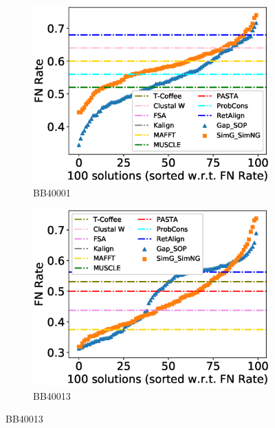 \begin{figure}[!htbp]
	\centering
	\begin{adjustwidth}{-1.5cm}{-1cm}
		\begin{subfigure}{0.22\textwidth}
			\includegraphics[width=\columnwidth]{Figure/summary/precomputedInit/Balibase/BB40001_fnrate_density_single_run}
			\caption{BB40001}
		\end{subfigure}	
		\begin{subfigure}{0.22\textwidth}
			\includegraphics[width=\columnwidth]{Figure/summary/precomputedInit/Balibase/BB40013_fnrate_density_single_run}
			\caption{BB40013}
		\end{subfigure}

\end{adjustwidth}
\end{figure}
